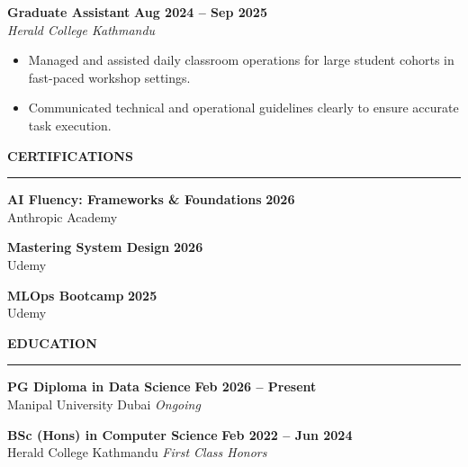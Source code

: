\documentclass[10.5pt,a4paper]{article}
\newcommand{\cvsection}[1]{%
  \vspace{9pt}%
  {\raggedright\textbf{\large\textcolor{darkcol}{\MakeUppercase{#1}}}\par
   \vspace{1pt}\textcolor{maincol}{\rule{0.3\linewidth}{2pt}}\par}%
  \vspace{6pt}}
\newenvironment{cvbullets}
  {\begin{itemize}[leftmargin=1.2em,itemsep=2pt,topsep=0pt,parsep=0pt,partopsep=0pt]}
  {\end{itemize}}
\begin{document}
\begin{minipage}[t]{0.6\textwidth}
\vspace{6pt}

\textbf{Graduate Assistant} \hfill \textbf{Aug 2024 -- Sep 2025} \\
\textit{Herald College Kathmandu}
\vspace{3pt}
\begin{cvbullets}
  \item Managed and assisted daily classroom operations for large student cohorts in fast-paced workshop settings.
  \item Communicated technical and operational guidelines clearly to ensure accurate task execution.
\end{cvbullets}

\cvsection{Certifications}

\textbf{AI Fluency: Frameworks \& Foundations} \hfill \textbf{2026} \\
Anthropic Academy

\vspace{4pt}

\textbf{Mastering System Design} \hfill \textbf{2026} \\
Udemy

\vspace{4pt}

\textbf{MLOps Bootcamp} \hfill \textbf{2025} \\
Udemy

\cvsection{Education}

\textbf{PG Diploma in Data Science} \hfill \textbf{Feb 2026 -- Present} \\
Manipal University Dubai \hfill \textit{Ongoing}

\vspace{4pt}

\textbf{BSc (Hons) in Computer Science} \hfill \textbf{Feb 2022 -- Jun 2024} \\
Herald College Kathmandu \hfill \textit{First Class Honors}

\end{minipage}
\end{document}
